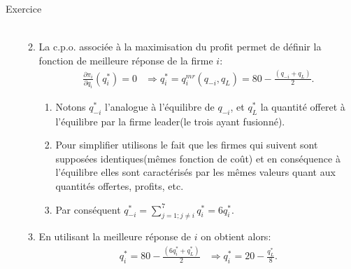\begin{frame}[allowframebreaks]{Exercice}
\begin{enumerate}
\begin{enumerate}[$\star$]
\begin{align*}
            \end{align*}
            \item La c.p.o. associée à la maximisation du profit permet de définir la fonction
            de meilleure réponse de la firme $i$:
            \begin{align*}
             \frac{\partial \pi_i}{\partial q_i}(q_i^{*}) = 0 &\Rightarrow 
             q_i^{*} = q_i^{mr}(q_{-i}, q_L) = 80 - \frac{(q_{-i} + q_L)}{2}.
             \end{align*}
             \begin{enumerate}[$\star$]
                \item Notons $q_{-i}^{*}$ l'analogue à l'équilibre de $q_{-i}$, et $q_L^*$ la quantité offeret
               à l'équilibre par la firme leader(le trois ayant fusionné). 
               \item Pour simplifier utilisons le fait que les firmes qui suivent 
               sont supposées identiques(mêmes fonction de coût) et en conséquence 
               à l'équilibre elles sont caractérisés par les mêmes valeurs quant aux quantités offertes, profits, etc.  
               \item Par conséquent $q_{-i}^{*} = \sum_{j=1; j\neq i}^7 q_i^* = 6q_i^*$.
              \end{enumerate}
              \item En utilisant la meilleure réponse de $i$ on obtient alors:
              \begin{align*}
                  q_i^{*}= 80 - \frac{(6q_i^* + q_L^*)}{2} &\Rightarrow q_i^* = 20 -\frac{q_L^*}{8}.
                  \end{align*}


\end{enumerate}
\end{enumerate}
\end{frame}
